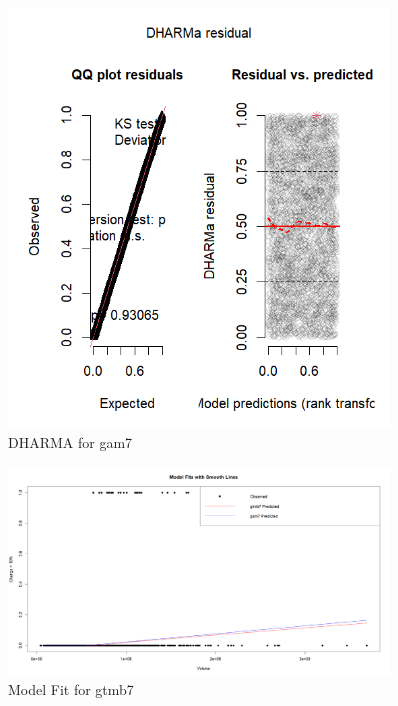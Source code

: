 \begin{figure}[h]
    \centering
    \includegraphics[width=0.9\textwidth]{visuals/DHARMa_gam7.png}
    \caption{DHARMA for gam7}
    \label{fig:dharmagam7}
\end{figure}

\begin{figure}[h]
    \centering
    \includegraphics[width=0.9\textwidth]{visuals/model_fit_gtmb7.png}
    \caption{Model Fit for gtmb7}
    \label{fig:modfitgtmb7}
\end{figure}


